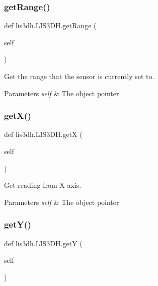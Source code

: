 \subsubsection{\texorpdfstring{get\+Range()}{getRange()}}
{\footnotesize\ttfamily def lis3dh.\+L\+I\+S3\+D\+H.\+get\+Range (\begin{DoxyParamCaption}\item[{}]{self }\end{DoxyParamCaption})}



Get the range that the sensor is currently set to. 


\begin{DoxyParams}{Parameters}
{\em self} & The object pointer \\
\hline
\end{DoxyParams}
\mbox{\label{classlis3dh_1_1_l_i_s3_d_h_a3b0455f4540add2bddabec0bdc4e0f65}} 
\subsubsection{\texorpdfstring{get\+X()}{getX()}}
{\footnotesize\ttfamily def lis3dh.\+L\+I\+S3\+D\+H.\+getX (\begin{DoxyParamCaption}\item[{}]{self }\end{DoxyParamCaption})}



Get reading from X axis. 


\begin{DoxyParams}{Parameters}
{\em self} & The object pointer \\
\hline
\end{DoxyParams}
\mbox{\label{classlis3dh_1_1_l_i_s3_d_h_a0939f6296902553b2cc3cd75e5adec99}} 
\subsubsection{\texorpdfstring{get\+Y()}{getY()}}
{\footnotesize\ttfamily def lis3dh.\+L\+I\+S3\+D\+H.\+getY (\begin{DoxyParamCaption}\item[{}]{self }\end{DoxyParamCaption})}




